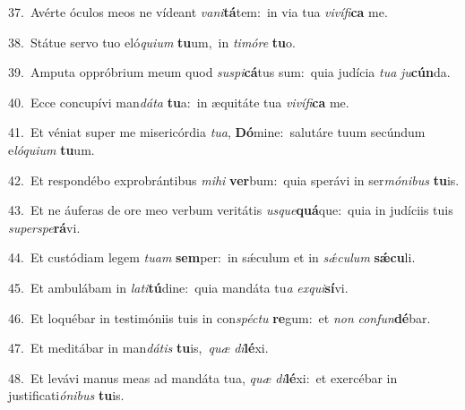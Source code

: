 {\numbfont\textcolor{\numbcolor}{37.}}~Avérte óculos meos ne vídeant \textit{va}\-\textit{ni}\textbf{tá}tem:~\star in via tua \textit{vi}\-\textit{ví}\textit{fi}\textbf{ca} me.\par
{\numbfont\textcolor{\numbcolor}{38.}}~Státue servo tuo eló\-\textit{qui}\-\textit{um} \textbf{tu}\-um,~\star in \textit{ti}\-\textit{mó}\textit{re} \textbf{tu}\-o.\par
{\numbfont\textcolor{\numbcolor}{39.}}~Amputa oppróbrium meum quod \textit{su}\-\textit{spi}\textbf{cá}tus sum:~\star quia judícia \textit{tu}\-\textit{a} \textit{ju}\-\textbf{cún}da.\par
{\numbfont\textcolor{\numbcolor}{40.}}~Ecce concupívi man\-\textit{dá}\-\textit{ta} \textbf{tu}\-a:~\star in æquitáte tua \textit{vi}\-\textit{ví}\textit{fi}\textbf{ca} me.\par
{\numbfont\textcolor{\numbcolor}{41.}}~Et véniat super me misericórdia \textit{tu}\-\textit{a}, \textbf{Dó}\-mine:~\star salutáre tuum secúndum e\-\textit{ló}\-\textit{qui}\textit{um} \textbf{tu}\-um.\par
{\numbfont\textcolor{\numbcolor}{42.}}~Et respondébo exprobrántibus \textit{mi}\-\textit{hi} \textbf{ver}\-bum:~\star quia sperávi in ser\-\textit{mó}\-\textit{ni}\textit{bus} \textbf{tu}\-is.\par
{\numbfont\textcolor{\numbcolor}{43.}}~Et ne áuferas de ore meo verbum veritátis \textit{us}\-\textit{que}\textbf{quá}que:~\star quia in judíciis tuis \textit{su}\-\textit{per}\textit{spe}\textbf{rá}vi.\par
{\numbfont\textcolor{\numbcolor}{44.}}~Et custódiam legem \textit{tu}\-\textit{am} \textbf{sem}\-per:~\star in sǽculum et in \textit{sǽ}\-\textit{cu}\textit{lum} \textbf{sǽ}\-\textbf{cu}li.\par
{\numbfont\textcolor{\numbcolor}{45.}}~Et ambulábam in \textit{la}\-\textit{ti}\textbf{tú}dine:~\star quia mandáta tu\textit{a} \textit{ex}\-\textit{qui}\textbf{sí}vi.\par
{\numbfont\textcolor{\numbcolor}{46.}}~Et loquébar in testimóniis tuis in con\-\textit{spéc}\-\textit{tu} \textbf{re}\-gum:~\star et \textit{non} \textit{con}\-\textit{fun}\textbf{dé}bar.\par
{\numbfont\textcolor{\numbcolor}{47.}}~Et meditábar in man\-\textit{dá}\-\textit{tis} \textbf{tu}\-is,~\star \textit{quæ} \textit{di}\-\textbf{lé}xi.\par
{\numbfont\textcolor{\numbcolor}{48.}}~Et levávi manus meas ad mandáta tua, \textit{quæ} \textit{di}\-\textbf{lé}xi:~\star et exercébar in justificati\-\textit{ó}\-\textit{ni}\textit{bus} \textbf{tu}\-is.\par

